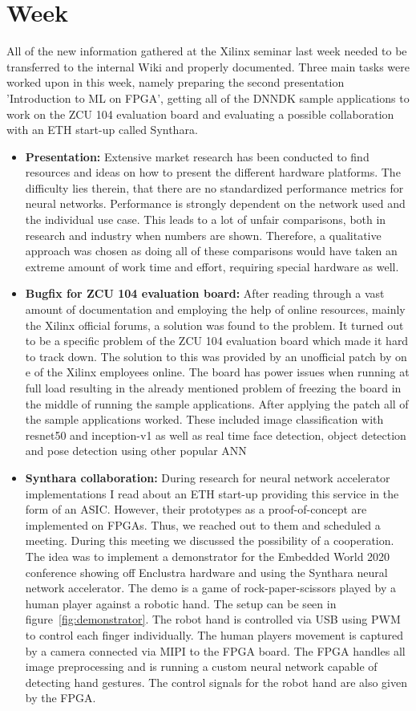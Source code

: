 \chapter{Week}
All of the new information gathered at the Xilinx seminar last week needed to be transferred to the internal Wiki and properly documented. Three main tasks were worked upon in this week, namely preparing the second presentation 'Introduction to \ac{ML} on \ac{FPGA}', getting all of the \ac{DNNDK} sample applications to work on the ZCU 104 evaluation board and evaluating a possible collaboration with an ETH start-up called Synthara.
\begin{itemize}
	\item \textbf{Presentation:} Extensive market research has been conducted to find resources and ideas on how to present the different hardware platforms. The difficulty lies therein, that there are no standardized performance metrics for neural networks. Performance is strongly dependent on the network used and the individual use case. This leads to a lot of unfair comparisons, both in research and industry when numbers are shown. Therefore, a qualitative approach was chosen as doing all of these comparisons would have taken an extreme amount of work time and effort, requiring special hardware as well.
	\item \textbf{Bugfix for ZCU 104 evaluation board:} After reading through a vast amount of documentation and employing the help of online resources, mainly the Xilinx official forums, a solution was found to the problem. It turned out to be a specific problem of the ZCU 104 evaluation board which made it hard to track down. The solution to this was provided by an unofficial patch by on e of the Xilinx employees online. The board has power issues when running at full load resulting in the already mentioned problem of freezing the board in the middle of running the sample applications. After applying the patch all of the sample applications worked. These included image classification with resnet50 and inception-v1 as well as real time face detection, object detection and pose detection using other popular \ac{ANN}
	\item \textbf{Synthara collaboration:} During research for neural network accelerator implementations I read about an ETH start-up providing this service in the form of an \ac{ASIC}. However, their prototypes as a proof-of-concept are implemented on \acp{FPGA}. Thus, we reached out to them and scheduled a meeting. During this meeting we discussed the possibility of a cooperation. The idea was to implement a demonstrator for the Embedded World 2020 conference showing off Enclustra hardware and using the Synthara neural network accelerator. The demo is a game of rock-paper-scissors played by a human player against a robotic hand. The setup can be seen in figure~\ref{fig:demonstrator}. The robot hand is controlled via \ac{USB} using \ac{PWM} to control each finger individually. The human players movement is captured by a camera connected via \ac{MIPI} to the \ac{FPGA} board. The \ac{FPGA} handles all image preprocessing and is running a custom neural network capable of detecting hand gestures. The control signals for the robot hand are also given by the FPGA.

\end{itemize}
